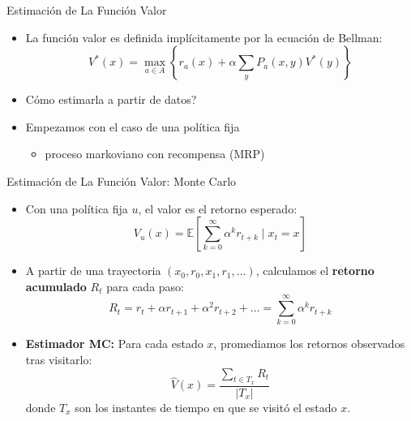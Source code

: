 \documentclass[xcolor=dvipsnames, handout]{beamer}
\begin{document}
\begin{frame}{Estimación de La Función Valor}
\begin{itemize}
\item La función valor es definida implícitamente por la ecuación de Bellman:
$$V^*(x) =  \max\limits_{a \in A} \left\{r_a(x)+\alpha \sum_y P_a(x,y) V^*(y)\right\}$$
\item Cómo estimarla a partir de datos?
\item<2-> Empezamos con el caso de una política fija \begin{itemize} 
\item<3-> proceso markoviano con recompensa (MRP)
\end{itemize}
\end{itemize}  
\end{frame}

\begin{frame}{Estimaci\'on de La Funci\'on Valor: Monte Carlo}
\begin{itemize}
    \item Con una pol\'itica fija $u$, el valor es el retorno esperado:
    \[ V_u(x) = \mathbb{E} \left[ \sum_{k=0}^\infty \alpha^k r_{t+k} \mid x_t = x \right] \]
    
    \item<2-> A partir de una trayectoria $(x_0, r_0, x_1, r_1, \dots)$, calculamos el \textbf{retorno acumulado} $R_t$ para cada paso:
    \[ R_t = r_t + \alpha r_{t+1} + \alpha^2 r_{t+2} + \dots = \sum_{k=0}^\infty \alpha^k r_{t+k} \]
    
    \item<3-> \textbf{Estimador MC:} Para cada estado $x$, promediamos los retornos observados tras visitarlo:
    \begin{equation*}
        \hat V(x) = \frac{\sum_{t \in T_x} R_t}{|T_x|}
    \end{equation*}
    donde $T_x$ son los instantes de tiempo en que se visit\'o el estado $x$.
\end{itemize}
\end{frame}
\end{document}
